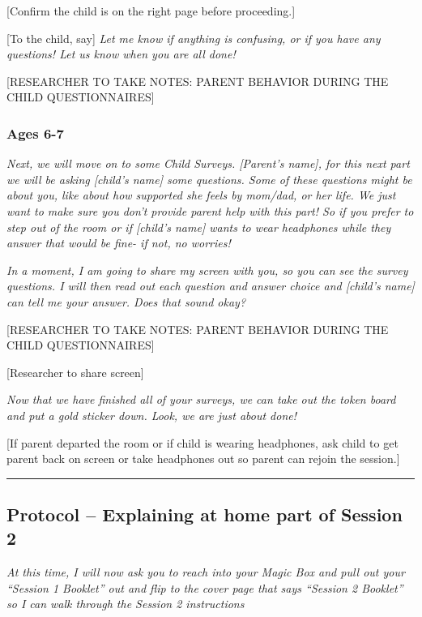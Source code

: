 \documentclass[]{book}
\begin{document}
{[}Confirm the child is on the right page before proceeding.{]}

{[}To the child, say{]} \emph{Let me know if anything is confusing, or if you have any questions! Let us know when you are all done!}

{[}RESEARCHER TO TAKE NOTES: PARENT BEHAVIOR DURING THE CHILD QUESTIONNAIRES{]}

\hypertarget{ages-6-7-2}{%
\subsubsection{Ages 6-7}\label{ages-6-7-2}}

\emph{Next, we will move on to some Child Surveys. {[}Parent's name{]}, for this next part we will be asking {[}child's name{]} some questions. Some of these questions might be about you, like about how supported she feels by mom/dad, or her life. We just want to make sure you don't provide parent help with this part! So if you prefer to step out of the room or if {[}child's name{]} wants to wear headphones while they answer that would be fine- if not, no worries!}

\emph{In a moment, I am going to share my screen with you, so you can see the survey questions. I will then read out each question and answer choice and {[}child's name{]} can tell me your answer. Does that sound okay? }

{[}RESEARCHER TO TAKE NOTES: PARENT BEHAVIOR DURING THE CHILD QUESTIONNAIRES{]}

{[}Researcher to share screen{]}

\emph{Now that we have finished all of your surveys, we can take out the token board and put a gold sticker down. Look, we are just about done!}

{[}If parent departed the room or if child is wearing headphones, ask child to get parent back on screen or take headphones out so parent can rejoin the session.{]}

\begin{center}\rule{0.5\linewidth}{0.5pt}\end{center}

\hypertarget{protocol-explaining-at-home-part-of-session-2-1}{%
\subsection{Protocol -- Explaining at home part of Session 2}\label{protocol-explaining-at-home-part-of-session-2-1}}

\emph{At this time, I will now ask you to reach into your Magic Box and pull out your ``Session 1 Booklet'' out and flip to the cover page that says ``Session 2 Booklet'' so I can walk through the Session 2 instructions}
\end{document}

